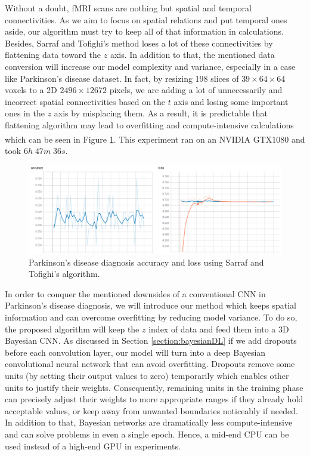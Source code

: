 \documentclass[a4paper,fleqn]{cas-dc}
\begin{document}
Without a doubt, fMRI scans are nothing but spatial and temporal connectivities. As we aim to focus on spatial relations and put temporal ones aside, our algorithm must try to keep all of that information in calculations. Besides, Sarraf and Tofighi's method loses a lot of these connectivities by flattening data toward the $z$ axis. In addition to that, the mentioned data conversion will increase our model complexity and variance, especially in a case like Parkinson's disease dataset. In fact, by resizing 198 slices of $39 \times 64 \times 64$ voxels to a 2D $2496 \times 12672$ pixels, we are adding a lot of unnecessarily and incorrect spatial connectivities based on the $t$ axis and losing some important ones in the $z$ axis by misplacing them. As a result, it is predictable that flattening algorithm may lead to overfitting and compute-intensive calculations which can be seen in Figure \ref{fig:SarrafParkinsonTestResult}. This experiment ran on an NVIDIA\textsuperscript{\tiny\textregistered} GTX1080 and took $6h \; 47m \; 36s$.


\begin{figure}
	\includegraphics[width=\linewidth]{images/SarrafParkinsonTestResult}
	\caption{Parkinson's disease diagnosis accuracy and loss using Sarraf and Tofighi's algorithm.}
	\label{fig:SarrafParkinsonTestResult}
\end{figure}


In order to conquer the mentioned downsides of a conventional CNN in Parkinson's disease diagnosis, we will introduce our method which keeps spatial information and can overcome overfitting by reducing model variance. To do so, the proposed algorithm will keep the $z$ index of data and feed them into a 3D Bayesian CNN. As discussed in Section \ref{section:bayesianDL} if we add dropouts before each convolution layer, our model will turn into a deep Bayesian convolutional neural network that can avoid overfitting. Dropouts remove some units (by setting their output values to zero) temporarily which enables other units to justify their weights. Consequently, remaining units in the training phase can precisely adjust their weights to more appropriate ranges if they already hold acceptable values, or keep away from unwanted boundaries noticeably if needed. In addition to that, Bayesian networks are dramatically less compute-intensive and can solve problems in even a single epoch. Hence, a mid-end CPU can be used instead of a high-end GPU in experiments.
\end{document}
